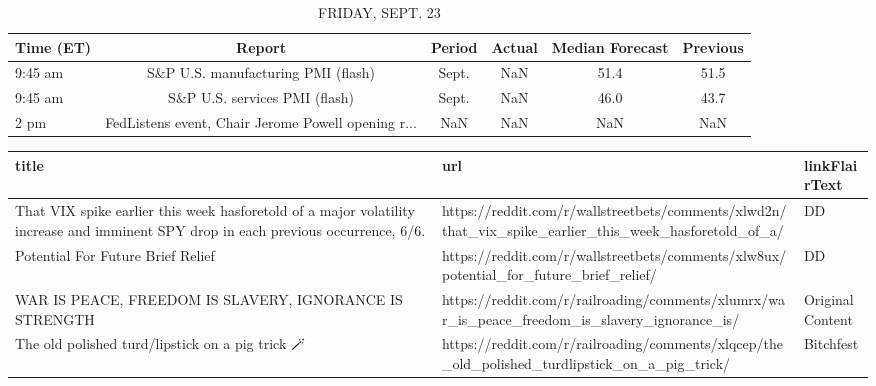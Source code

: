 \documentclass{book}
\begin{document}
  
  \begin{table}[htbp]%
  \caption{FRIDAY, SEPT. 23}%
  \centering%
  \begin{adjustbox}{width=1\textwidth}%
  \begin{tabular}{lccccc}
  \toprule
  Time (ET) &                                             Report & Period & Actual & Median Forecast & Previous \\
  \midrule
    9:45 am &                 S\&P U.S. manufacturing PMI (flash) &  Sept. &    NaN &            51.4 &     51.5 \\
    9:45 am &                      S\&P U.S. services PMI (flash) &  Sept. &    NaN &            46.0 &     43.7 \\
       2 pm & FedListens event, Chair Jerome Powell opening r... &    NaN &    NaN &             NaN &      NaN \\
  \bottomrule
  \end{tabular}
  \end{adjustbox}%
  \end{table}
  
  
  
  \begin{table}[htbp]%
  \centering%
  \begin{adjustbox}{width=1\textwidth}%
  \begin{tabular}{lll}
  \toprule
                                                                                                                                title &                                                                                                    url &    linkFlairText \\
  \midrule
  That VIX spike earlier this week hasforetold of a major volatility increase and imminent SPY drop in each previous occurrence, 6/6. & https://reddit.com/r/wallstreetbets/comments/xlwd2n/that\_vix\_spike\_earlier\_this\_week\_hasforetold\_of\_a/ &               DD \\
                                                                                                    Potential For Future Brief Relief &                 https://reddit.com/r/wallstreetbets/comments/xlw8ux/potential\_for\_future\_brief\_relief/ &               DD \\
                                                                              WAR IS PEACE, FREEDOM IS SLAVERY, IGNORANCE IS STRENGTH &         https://reddit.com/r/railroading/comments/xlumrx/war\_is\_peace\_freedom\_is\_slavery\_ignorance\_is/ & Original Content \\
                                                                                   The old polished turd/lipstick on a pig trick 🪄💩💄🐖 &         https://reddit.com/r/railroading/comments/xlqcep/the\_old\_polished\_turdlipstick\_on\_a\_pig\_trick/ &        Bitchfest \\
  \bottomrule
  \end{tabular}
  \end{adjustbox}%
  \end{table}
  
\end{document}
